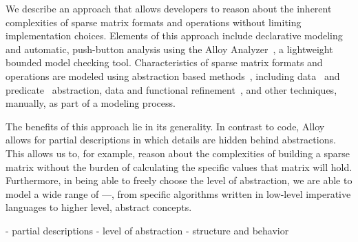 We describe an approach that allows developers to reason about the inherent complexities of sparse matrix formats and operations without limiting implementation choices.  Elements of this approach include declarative modeling and automatic, push-button analysis using the Alloy Analyzer~\cite{jackson2012}, a lightweight bounded model checking tool.  Characteristics of sparse matrix formats and operations are modeled using abstraction based methods~\cite{clarke1994}, including data~\cite{dingel1995} and predicate~\cite{graf1997} abstraction, data and functional refinement~\cite{woodcock1996}, and other techniques, manually, as part of a modeling process.


The benefits of this approach lie in its generality.  In contrast to code, Alloy allows for partial descriptions in which details are hidden behind abstractions.  This allows us to, for example, reason about the complexities of building a sparse matrix without the burden of calculating the specific values that matrix will hold.  Furthermore, in being able to freely choose the level of abstraction, we are able to model a wide range of ---, from specific algorithms written in low-level imperative languages to higher level, abstract concepts. 

- partial descriptions
- level of abstraction
- structure and behavior


